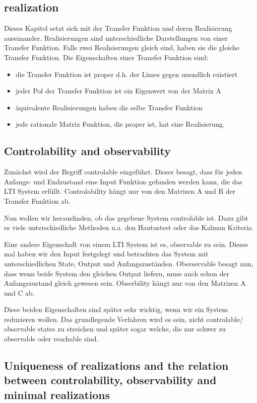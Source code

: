 \documentclass[]{article}
\begin{document}
\subsection{realization}
Dieses Kapitel setzt sich mit der Transfer Funktion und deren Realisierung auseinander. Realisierungen sind unterschiedliche Darstellungen von einer Transfer Funktion. Falls zwei Realisierungen gleich sind, haben sie die gleiche Transfer Funktion.  
 Die Eigenschaften einer Transfer Funktion sind: 
\begin{itemize}
	\item die Transfer Funktion ist proper d.h. der Limes gegen unendlich existiert
	\item jeder Pol der Transfer Funktion ist ein Eigenwert von der Matrix A
	\item äquivalente Realisierungen haben die selbe Transfer Funktion
	\item jede rationale Matrix Funktion, die proper ist, hat eine Realisierung. 
\end{itemize}

\subsection{Controlability and observability}
Zunächst wird der Begriff controlable eingeführt. Dieser besagt, dass für jeden Anfangs- und Endzustand eine Input Funktion gefunden werden kann, die das LTI System erfüllt. Controlability hängt nur von den Matrizen A und B der Transfer Funktion ab. 

Nun wollen wir herausfinden, ob das gegebene System controlable ist. Dazu gibt es viele unterschiedliche Methoden u.a. den Hautustest oder das Kalman Kriteria. 

Eine andere Eigenschaft von einem LTI System ist es, observable zu sein. Dieses mal haben wir den Input festgelegt und betrachten das System mit unterschiedlichen State, Output und Anfangszuständen. Oberservable besagt nun, dass wenn beide System den gleichen Output liefern, muss auch schon der Anfangszustand gleich gewesen sein. Obserbility hängt nur von den Matrizen A und C ab. 

Diese beiden Eigenschaften sind später sehr wichtig, wenn wir ein System reduzieren wollen. Das grundlegende Verfahren wird es sein, nicht controlable/ observable states zu streichen und später sogar welche, die nur schwer zu observable oder reachable sind. 

\subsection{Uniqueness of realizations and the relation between controlability, observability and minimal realizations}
\end{document}
